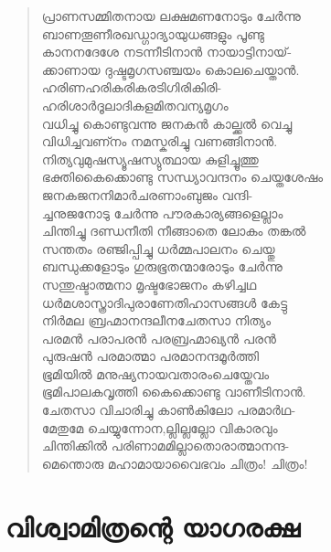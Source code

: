 \begin{verse}
പ്രാണസമ്മിതനായ ലക്ഷമണനോടും ചേര്‍ന്നു\\
ബാണതൂണീരഖഡ്ഗാദ്യായുധങ്ങളും പൂണ്ടു\\
കാനനദേശേ നടന്നീടിനാന്‍ നായാട്ടിനായ്-\\
ക്കാണായ ദുഷ്ടമൃഗസഞ്ചയം കൊലചെയ്താന്‍.\\
ഹരിണഹരികരികരടിഗിരികിരി-\\
ഹരിശാര്‍ദൂലാദികളമിതവന്യമൃഗം\\
വധിച്ചു കൊണ്ടുവന്നു ജനകന്‍ കാല്ക്കല്‍ വെച്ചു\\
വിധിച്ചവണ്നം നമസ്കരിച്ചു വണങ്ങിനാന്‍.\\
നിത്യവുമുഷസ്യൂഷസ്യുത്ഥായ കുളിച്ചൂത്തു\\
ഭക്തികൈക്കൊണ്ടു സന്ധ്യാവന്ദനം ചെയ്തശേഷം\\
ജനകജനനിമാര്‍ചരണാംബുജം വന്ദി-\\
ച്ചനുജനോടു ചേര്‍ന്നു പൗരകാര്യങ്ങളെല്ലാം\\
ചിന്തിച്ചു ദണ്ഡനീതി നീങ്ങാതെ ലോകം തങ്കല്‍\\
സന്തതം രഞ്ജിപ്പിച്ചു ധര്‍മ്മപാലനം ചെയ്തു\\
ബന്ധുക്കളോടും ഗുരുഭൂതന്മാരോടും ചേര്‍ന്നു\\
സന്തുഷ്ടാത്മനാ മൃഷ്ടഭോജനം കഴിച്ചഥ\\
ധര്‍മശാസ്ത്രാദിപുരാണേതിഹാസങ്ങള്‍ കേട്ടു\\
നിര്‍മല ബ്രഹ്മാനന്ദലീനചേതസാ നിത്യം\\
പരമന്‍ പരാപരന്‍ പരബ്രഹ്മാഖ്യന്‍ പരന്‍\\
പുരുഷന്‍ പരമാത്മാ പരമാനന്ദമൂര്‍ത്തി\\
ഭൂമിയില്‍ മനുഷ്യനായവതാരംചെയ്തേവം\\
ഭൂമിപാലകവൃത്തി കൈക്കൊണ്ടു വാണീടിനാന്‍.\\
ചേതസാ വിചാരിച്ചു കാണ്‍കിലോ പരമാര്‍ഥ-\\
മേതുമേ ചെയ്യുന്നോന,ല്ലില്ലല്ലോ വികാരവും\\
ചിന്തിക്കില്‍ പരിണാമമില്ലാതൊരാത്മാനന്ദ-\\
മെന്തൊരു മഹാമായാവൈഭവം ചിത്രം! ചിത്രം!
\end{verse}


\section{വിശ്വാമിത്രന്റെ യാഗരക്ഷ}

